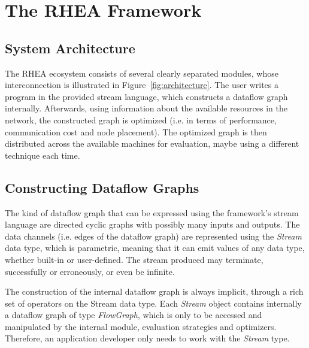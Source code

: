 \documentclass[sigplan,review,anonymous,screen]{acmart}
\begin{document}
\section{The RHEA Framework} \label{sec:approach}

\subsection{System Architecture}
The \textsc{RHEA} ecosystem consists of several clearly separated modules,
whose interconnection is illustrated in Figure~\ref{fig:architecture}.
%
%
The user writes a program in the provided stream language, which constructs a
dataflow graph internally. Afterwards, using information about the available
resources in the network, the constructed graph is optimized (i.e. in terms of
performance, communication cost and node placement). The optimized graph is then
distributed across the available machines for evaluation, maybe using a
different technique each time.

\subsection{Constructing Dataflow Graphs}

The kind of dataflow graph that can be expressed using the framework's stream
language are directed cyclic graphs with possibly many inputs and outputs.
%
The data channels (i.e. edges of the dataflow graph) are represented using the
\textit{Stream} data type, which is parametric, meaning that it can emit values
of any data type, whether built-in or user-defined. The stream produced may
terminate, successfully or erroneously, or even be infinite.

The construction of the internal dataflow graph is always implicit, through a
rich set of operators on the Stream data type. Each \textit{Stream} object
contains internally a dataflow graph of type \textit{FlowGraph}, which is only
to be accessed and manipulated by the internal module, evaluation strategies and
optimizers. Therefore, an application developer only needs to work with the
\textit{Stream} type.
\end{document}
